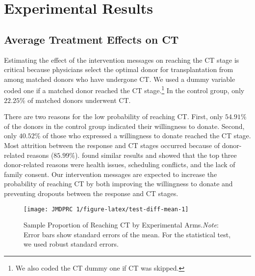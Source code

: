\documentclass[12pt, a4paper]{article}
\begin{document}
\hypertarget{result}{%
\section{Experimental Results}\label{result}}

\hypertarget{main}{%
\subsection{Average Treatment Effects on CT}\label{main}}

Estimating the effect of the intervention messages on reaching the CT stage is critical because physicians select the optimal donor for transplantation from among matched donors who have undergone CT. We used a dummy variable coded one if a matched donor reached the CT stage.\footnote{We also coded the CT dummy one if CT was skipped.} In the control group, only \(22.25\)\% of matched donors underwent CT.

There are two reasons for the low probability of reaching CT. First, only \(54.91\)\% of the donors in the control group indicated their willingness to donate. Second, only \(40.52\)\% of those who expressed a willingness to donate reached the CT stage. Most attrition between the response and CT stages occurred because of donor-related reasons (\(85.99\)\%). \citet{Hirakawa2018} found similar results and showed that the top three donor-related reasons were health issues, scheduling conflicts, and the lack of family consent. Our intervention messages are expected to increase the probability of reaching CT by both improving the willingness to donate and preventing dropouts between the response and CT stages.

\begin{figure}[t]
\texttt{[image: JMDPRC~1/figure-latex/test-diff-mean-1]} \caption{Sample Proportion of Reaching CT by Experimental Arms.\newline \emph{Note}: Error bars show standard errors of the mean. For the statistical test, we used robust standard errors.}\label{fig:test-diff-mean}
\end{figure}
\end{document}
